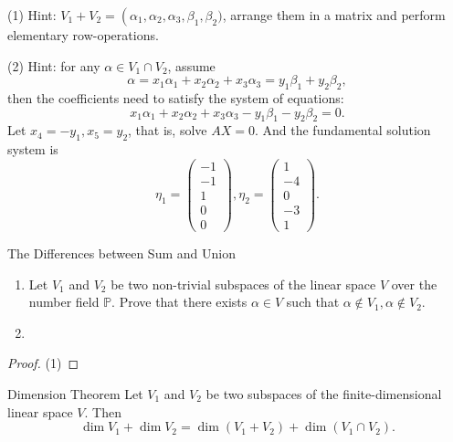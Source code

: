 \begin{solution}
  (1) Hint: $V_1 + V_2 = \operatorname(\alpha_1, \alpha_2, \alpha_3, \beta_1,
  \beta_2)$,
  arrange them in a matrix and perform elementary row-operations.

  (2) Hint: for any $\alpha \in V_1 \cap V_2$,
  assume
  \begin{equation}
    \alpha = x_1 \alpha_1 + x_2 \alpha_2 + x_3 \alpha_3 = y_1 \beta_1 + y_2 \beta_2,
  \end{equation}
  then the coefficients need to satisfy the system of equations:
  \begin{equation}
    x_1 \alpha_1 + x_2 \alpha_2 + x_3 \alpha_3 - y_1 \beta_1 - y_2 \beta_2 = 0.
  \end{equation}
  Let $x_4 = -y_1, x_5 = y_2$, that is, solve $AX = 0$.
  And the fundamental solution system is
  \begin{equation}
    \left.\eta_1=\left(\begin{array}{c}-1\\-1\\1\\0\\0\end{array}\right.\right),\eta_2=\left( \begin{array}{c}1\\-4\\0\\-3\\1\end{array} \right).
  \end{equation}
\end{solution}

\begin{example}{The Differences between Sum and Union}{}
  \begin{enumerate}
  \item Let $V_1$ and $V_2$ be two non-trivial subspaces of the linear space $V$ over
  the number field $\mathbb{P}$. Prove that there exists $\alpha \in V$ such that
  $\alpha \not\in V_1, \alpha \not \in V_2$.
  \item 
  \end{enumerate}
\end{example}

\begin{proof}
  (1)
\end{proof}

\begin{theorem}{Dimension Theorem}{}
  Let $V_1$ and $V_2$ be two subspaces of the finite-dimensional linear space
  $V$. Then
  \begin{equation}
    \dim V_1 + \dim V_2 = \dim (V_1 + V_2) + \dim (V_1 \cap V_2).
  \end{equation}
\end{theorem}

